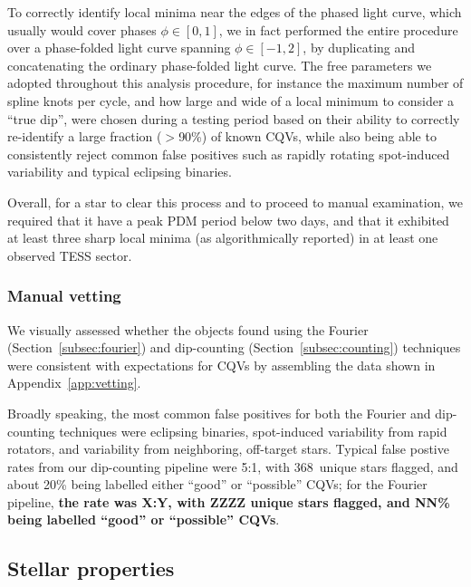 \documentclass[11pt,twocolumn,tighten]{aastex63}
\newcommand{\nuniqdipflagged}{{368}} %
\begin{document}
To correctly identify local minima near the edges of the phased light
curve, which usually would cover phases $\phi \in [ 0,1 ]$, we in fact
performed the entire procedure over a phase-folded light curve
spanning $\phi \in [-1,2 ]$, by duplicating and concatenating the
ordinary phase-folded light curve.  The free parameters we adopted
throughout this analysis procedure, for instance the maximum number of
spline knots per cycle, and how large and wide of a local minimum to
consider a ``true dip'', were chosen during a testing period based on
their ability to correctly re-identify a large fraction ($>$90\%) of
known CQVs, while also being able to consistently reject common false
positives such as rapidly rotating spot-induced variability and
typical eclipsing binaries.

Overall, for a star to clear this process and to proceed to manual
examination, we required that it have a peak PDM period below two
days, and that it exhibited at least three sharp local minima (as
algorithmically reported) in at least one observed TESS sector.


\subsubsection{Manual vetting}

We visually assessed whether the objects found using the Fourier
(Section~\ref{subsec:fourier}) and dip-counting
(Section~\ref{subsec:counting}) techniques were consistent with
expectations for CQVs by assembling the data shown in
Appendix~\ref{app:vetting}.

Broadly speaking, the most common false positives for both the Fourier
and dip-counting techniques were eclipsing binaries, spot-induced
variability from rapid rotators, and variability from neighboring,
off-target stars.  Typical false postive rates from our dip-counting
pipeline were 5:1, with \nuniqdipflagged\ unique stars flagged, and
about 20\% being labelled either ``good'' or ``possible'' CQVs; for
the Fourier pipeline, {\bf the rate was X:Y, with ZZZZ unique stars
flagged, and NN\% being labelled ``good'' or ``possible'' CQVs}.


\subsection{Stellar properties}
\end{document}
